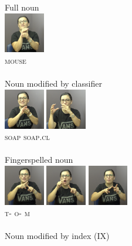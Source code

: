 \documentclass[]{elsarticle} %
\begin{document}
\begin{multicols}{2}
\begin{exe}
\ex
\begin{xlist}
\ex \label{ex:6a} Full noun \\\glll
\includegraphics[width=50pt]{pictures/1a_1.png}\\ \textsc{mouse\footnotemark} \\ \\ 
\ex \label{ex:6b} Noun modified by classifier \\\glll
\includegraphics[width=50pt]{pictures/1c_2.png} \includegraphics[width=50pt]{pictures/1c_1.png} \\ \textsc{soap} \textsc{soap.cl} \\ \\ 
\ex \label{ex:6c} Fingerspelled noun\\\glll 
\includegraphics[width=50pt]{pictures/1b_1.png} \includegraphics[width=50pt]{pictures/1b_2.png} \includegraphics[width=50pt]{pictures/1b_3.png}\\ \textsc{t-} \textsc{o-} \textsc{m} \\ \\
\ex \label{ex:6d} Noun modified by index (\textsc{IX})\\\glll 

\end{xlist}
\end{exe}
\end{multicols}
\end{document}
